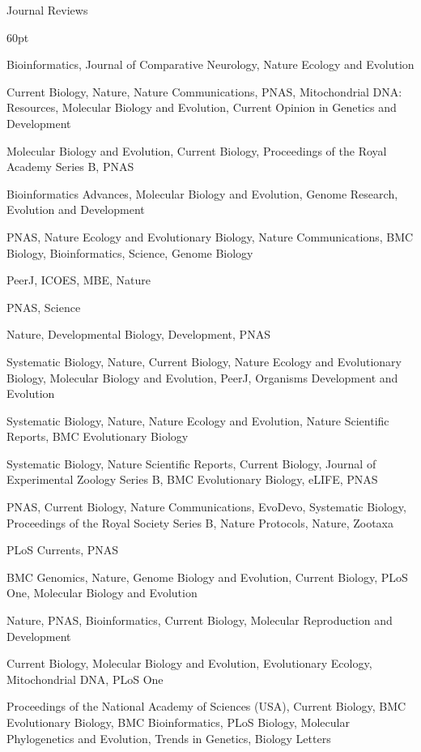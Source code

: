 Journal Reviews
\begin{entry}{60pt}
\item [\rm 2026] Bioinformatics, Journal of Comparative Neurology, Nature Ecology and Evolution
\item [\rm 2025] Current Biology, Nature, Nature Communications, PNAS, Mitochondrial DNA: Resources, Molecular Biology and Evolution, Current Opinion in Genetics and Development
\item [\rm 2024] Molecular Biology and Evolution, Current Biology, Proceedings of the Royal Academy Series B, PNAS
\item [\rm 2023] Bioinformatics Advances, Molecular Biology and Evolution, Genome Research, Evolution and Development
\item [\rm 2022] PNAS, Nature Ecology and Evolutionary Biology, Nature Communications, BMC Biology, Bioinformatics, Science, Genome Biology
\item [\rm 2021] PeerJ, ICOES, MBE, Nature
\item [\rm 2020] PNAS, Science
\item [\rm 2019] Nature, Developmental Biology, Development, PNAS
\item [\rm 2018] Systematic Biology, Nature, Current Biology, Nature Ecology and Evolutionary Biology, Molecular Biology and Evolution, PeerJ, Organisms Development and Evolution
\item [\rm 2017] Systematic Biology, Nature, Nature Ecology and Evolution, Nature Scientific Reports, BMC Evolutionary Biology
\item [\rm 2016] Systematic Biology, Nature Scientific Reports, Current Biology, Journal of Experimental Zoology Series B, BMC Evolutionary Biology, eLIFE, PNAS
\item [\rm 2015] PNAS, Current Biology, Nature Communications, EvoDevo, Systematic Biology, Proceedings of the Royal Society Series B, Nature Protocols, Nature, Zootaxa
\item [\rm 2014] PLoS Currents, PNAS
\item [\rm 2013] BMC Genomics, Nature, Genome Biology and Evolution, Current Biology, PLoS One, Molecular Biology and Evolution
\item [\rm 2012] Nature, PNAS, Bioinformatics, Current Biology, Molecular Reproduction and Development
\item [\rm 2011] Current Biology, Molecular Biology and Evolution, Evolutionary Ecology, Mitochondrial DNA, PLoS One
\item [\rm 2010] Proceedings of the National Academy of Sciences (USA), Current Biology, BMC Evolutionary Biology, BMC Bioinformatics, PLoS Biology, Molecular Phylogenetics and Evolution, Trends in Genetics, Biology Letters

\end{entry}
